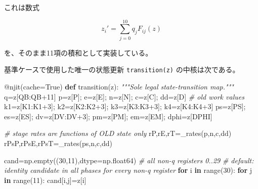 \documentclass[
  a4paper,
]{ltjsarticle}
\newenvironment{Shaded}{}{}
\newcommand{\AttributeTok}[1]{\textcolor[rgb]{0.49,0.56,0.16}{#1}}
\newcommand{\BuiltInTok}[1]{\textcolor[rgb]{0.00,0.50,0.00}{#1}}
\newcommand{\CommentTok}[1]{\textcolor[rgb]{0.38,0.63,0.69}{\textit{#1}}}
\newcommand{\ControlFlowTok}[1]{\textcolor[rgb]{0.00,0.44,0.13}{\textbf{#1}}}
\newcommand{\DecValTok}[1]{\textcolor[rgb]{0.25,0.63,0.44}{#1}}
\newcommand{\KeywordTok}[1]{\textcolor[rgb]{0.00,0.44,0.13}{\textbf{#1}}}
\newcommand{\NormalTok}[1]{#1}
\newcommand{\OperatorTok}[1]{\textcolor[rgb]{0.40,0.40,0.40}{#1}}
\newcommand{\VariableTok}[1]{\textcolor[rgb]{0.10,0.09,0.49}{#1}}
\begin{document}
これは数式

\[
\boxed{
z_i'=\sum_{j=0}^{10}q_jF_{ij}(z)}
\]

を、そのまま11項の積和として実装している。

基準ケースで使用した唯一の状態更新 \texttt{transition(z)}
の中核は次である。

\begin{Shaded}
\begin{Highlighting}[]
\AttributeTok{@njit}\NormalTok{(cache}\OperatorTok{=}\VariableTok{True}\NormalTok{)}
\KeywordTok{def}\NormalTok{ transition(z):}
    \CommentTok{"""Sole legal state{-}transition map."""}
\NormalTok{    q}\OperatorTok{=}\NormalTok{z[QB:QB}\OperatorTok{+}\DecValTok{11}\NormalTok{]}
\NormalTok{    p}\OperatorTok{=}\NormalTok{z[P]}\OperatorTok{;}\NormalTok{ e}\OperatorTok{=}\NormalTok{z[E]}\OperatorTok{;}\NormalTok{ n}\OperatorTok{=}\NormalTok{z[N]}\OperatorTok{;}\NormalTok{ c}\OperatorTok{=}\NormalTok{z[C]}\OperatorTok{;}\NormalTok{ dd}\OperatorTok{=}\NormalTok{z[D]}
    \CommentTok{\# old work values}
\NormalTok{    k1}\OperatorTok{=}\NormalTok{z[K1:K1}\OperatorTok{+}\DecValTok{3}\NormalTok{]}\OperatorTok{;}\NormalTok{ k2}\OperatorTok{=}\NormalTok{z[K2:K2}\OperatorTok{+}\DecValTok{3}\NormalTok{]}\OperatorTok{;}\NormalTok{ k3}\OperatorTok{=}\NormalTok{z[K3:K3}\OperatorTok{+}\DecValTok{3}\NormalTok{]}\OperatorTok{;}\NormalTok{ k4}\OperatorTok{=}\NormalTok{z[K4:K4}\OperatorTok{+}\DecValTok{3}\NormalTok{]}
\NormalTok{    ps}\OperatorTok{=}\NormalTok{z[PS]}\OperatorTok{;}\NormalTok{ es}\OperatorTok{=}\NormalTok{z[ES]}\OperatorTok{;}\NormalTok{ dv}\OperatorTok{=}\NormalTok{z[DV:DV}\OperatorTok{+}\DecValTok{3}\NormalTok{]}\OperatorTok{;}\NormalTok{ pm}\OperatorTok{=}\NormalTok{z[PM]}\OperatorTok{;}\NormalTok{ em}\OperatorTok{=}\NormalTok{z[EM]}\OperatorTok{;}\NormalTok{ dphi}\OperatorTok{=}\NormalTok{z[DPHI]}

    \CommentTok{\# stage rates are functions of OLD state only}
\NormalTok{    rP,rE,rT}\OperatorTok{=}\NormalTok{\_rates(p,n,c,dd)}
\NormalTok{    rPsP,rPsE,rPsT}\OperatorTok{=}\NormalTok{\_rates(ps,n,c,dd)}

\NormalTok{    cand}\OperatorTok{=}\NormalTok{np.empty((}\DecValTok{30}\NormalTok{,}\DecValTok{11}\NormalTok{),dtype}\OperatorTok{=}\NormalTok{np.float64)  }\CommentTok{\# all non{-}q registers 0..29}
    \CommentTok{\# default: identity candidate in all phases for every non{-}q register}
    \ControlFlowTok{for}\NormalTok{ i }\KeywordTok{in} \BuiltInTok{range}\NormalTok{(}\DecValTok{30}\NormalTok{):}
        \ControlFlowTok{for}\NormalTok{ j }\KeywordTok{in} \BuiltInTok{range}\NormalTok{(}\DecValTok{11}\NormalTok{): cand[i,j]}\OperatorTok{=}\NormalTok{z[i]}


\end{Highlighting}
\end{Shaded}
\end{document}
